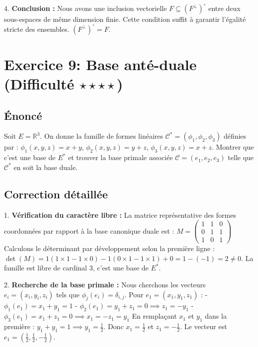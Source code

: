 \documentclass[11pt,a4paper]{report}
\begin{document}
4. \textbf{Conclusion :}
   Nous avons une inclusion vectorielle $F \subseteq (F^\perp)^\circ$ entre deux sous-espaces de même dimension finie.
   Cette condition suffit à garantir l'égalité stricte des ensembles.
   $(F^\perp)^\circ = F$.

\section{Exercice 9: Base anté-duale (Difficulté $\star \star \star \star$)}

\subsection{Énoncé}
Soit $E = \mathbb{R}^3$. On donne la famille de formes linéaires $\mathcal{C}^* = (\phi_1, \phi_2, \phi_3)$ définies par :
$\phi_1(x, y, z) = x + y$, $\phi_2(x, y, z) = y + z$, $\phi_3(x, y, z) = x + z$.
Montrer que c'est une base de $E^*$ et trouver la base primale associée $\mathcal{C} = (e_1, e_2, e_3)$ telle que $\mathcal{C}^*$ en soit la base duale.

\subsection{Correction détaillée}

1. \textbf{Vérification du caractère libre :}
   La matrice représentative des formes coordonnées par rapport à la base canonique duale est :
   $M = \begin{pmatrix} 1 & 1 & 0 \\ 0 & 1 & 1 \\ 1 & 0 & 1 \end{pmatrix}$
   Calculons le déterminant par développement selon la première ligne :
   $\det(M) = 1(1 \times 1 - 1 \times 0) - 1(0 \times 1 - 1 \times 1) + 0 = 1 - (-1) = 2 \neq 0$.
   La famille est libre de cardinal 3, c'est une base de $E^*$.

2. \textbf{Recherche de la base primale :}
   Nous cherchons les vecteurs $e_i = (x_i, y_i, z_i)$ tels que $\phi_j(e_i) = \delta_{i,j}$.
   Pour $e_1 = (x_1, y_1, z_1)$ :
   - $\phi_1(e_1) = x_1 + y_1 = 1$
   - $\phi_2(e_1) = y_1 + z_1 = 0 \implies z_1 = -y_1$
   - $\phi_3(e_1) = x_1 + z_1 = 0 \implies x_1 = -z_1 = y_1$
   En remplaçant $x_1$ et $y_1$ dans la première : $y_1 + y_1 = 1 \implies y_1 = \frac{1}{2}$.
   Donc $x_1 = \frac{1}{2}$ et $z_1 = -\frac{1}{2}$. Le vecteur est $e_1 = (\frac{1}{2}, \frac{1}{2}, -\frac{1}{2})$.
\end{document}
